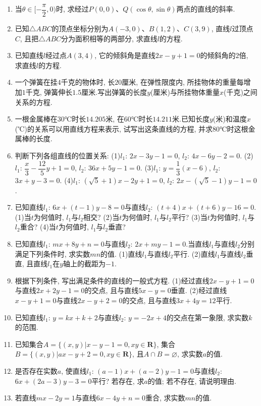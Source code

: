 \documentclass[10pt,a4paper]{article}
\newcommand{\blank}[1]{\underline{\hbox to #1pt{}}}
\newcommand{\bracket}[1]{(\hbox to #1pt{})}
\newcommand{\fourch}[4]{\par\begin{tabular}{p{.23\textwidth}p{.23\textwidth}p{.23\textwidth}p{.23\textwidth}}
A.~#1 &B.~#2& C.~#3& D.~#4
\end{tabular}}
\begin{document}
\begin{enumerate}[1.]
直线$x-ay+2=0(a<0)$的倾斜角是\blank{50}\bracket{20}.
\fourch{$\arctan \dfrac 1a$}{$-\arctan \dfrac 1a$}{$\pi -\arctan \dfrac 1a$}{$\pi +\arctan \dfrac 1a$}
\item 当$\theta \in [-\dfrac{\pi }2,0)$时, 求经过$P(0,0)$、$Q(\cos \theta ,\sin \theta)$两点的直线的斜率.
\item 已知$\triangle ABC$的顶点坐标分别为$A(-3,0)$、$B(1,2)$、$C(3,9)$, 直线$l$过顶点$C$, 且把$\triangle ABC$分为面积相等的两部分, 求直线$l$的方程.
\item 已知直线$l$经过点$A(3,4)$, 它的倾斜角是直线$2x-y+1=0$的倾斜角的$2$倍, 求直线$l$的方程.
\item 一个弹簧在挂$4$千克的物体时, 长$20$厘米, 在弹性限度内, 所挂物体的重量每增加$1$千克, 弹簧伸长$1.5$厘米.写出弹簧的长度$y$(厘米)与所挂物体重量$x$(千克)之间关系的方程.
\item 一根金属棒在$30℃$时长$14.205$米, 在$60℃$时长$14.211$米.已知长度$y$(米)和温度$x$(℃)的关系可以用直线方程来表示, 试写出这条直线的方程, 并求$80℃$时这根金属棒的长度.
\item 判断下列各组直线的位置关系:
(1)$l_1$: $2x-3y-1=0$, $l_2$: $4x-6y-2=0$.
(2)$l_1$: $\dfrac x3-\dfrac{12}5y+1=0$, $l_2$: $36x+5y-1=0$.
(3)$l_1$: $y=\dfrac 13(x-6)$, $l_2$: $3x+y-3=0$.
(4)$l_1$: $(\sqrt 5+1)x-2y+1=0$, $l_2$: $2x-(\sqrt 5-1)y-1=0$.
\item 已知直线$l_1$: $6x+(t-1)y-8=0$与直线$l_2$: $(t+4)x+(t+6)y-16=0$.
(1)当$t$为何值时, $l_1$与$l_2$相交?
(2)当$t$为何值时, $l_1$与$l_2$平行?
(3)当$t$为何值时, $l_1$与$l_2$重合?
(4)当$t$为何值时, $l_1$与$l_2$垂直?
\item 已知直线$l_1$: $mx+8y+n=0$与直线$l_2$: $2x+my-1=0$.当直线$l_1$与直线$l_2$分别满足下列条件时, 求实数$mn$的值.
(1)直线$l_1$与直线$l_2$平行.
(2)直线$l_1$与直线$l_2$垂直, 且直线$l_1$在$y$轴上的截距为$-1$.
\item 根据下列条件, 写出满足条件的直线的一般式方程.
(1)经过直线$2x-y+1=0$与直线$2x+2y-1=0$的交点, 且与直线$5x-y=0$垂直.
(2)经过直线$x-y+1=0$与直线$2x-y+2=0$的交点, 且与直线$3x+4y=12$平行.
\item 已知直线$l_1$: $y=kx+k+2$与直线$l_2$: $y=-2x+4$的交点在第一象限, 求实数$k$的范围.
\item 已知集合$A=\{(x,y)|x-y-1=0,xy\in \mathbf{R}\}$, 集合$B=\{(x,y)|ax-y+2=0,xy\in \mathbf{R}\}$, 且$A\cap B=\varnothing$, 求实数$a$的值.
\item 是否存在实数$a$, 使直线$l_1$: $(a-1)x+(a-2)y-1=0$与直线$l_2$: $6x+(2a-3)y-3=0$平行? 若存在, 求$a$的值; 若不存在, 请说明理由.
\item 若直线$mx-2y=1$与直线$6x-4y+n=0$重合, 求实数$mn$的值.

\end{enumerate}
\end{document}
